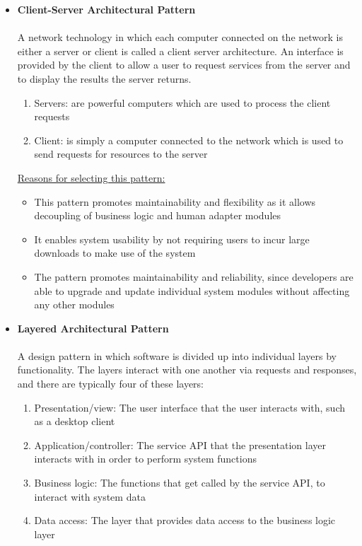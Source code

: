 \documentclass[a4paper,10pt]{article}
\begin{document}
\begin{itemize}
	\item \textbf {Client-Server Architectural Pattern} \\\\
	A network technology in which each computer connected on the network is either a server or client is called a client server architecture. An interface is provided by the client to allow a user to request services from the server and to display the results the server returns. 
	\begin{enumerate}
		\item Servers: are powerful computers which are used to process the client requests
		\item Client: is simply a computer connected to the network which is used to send requests for resources to the server\\
	\end{enumerate}
	\underline{Reasons for selecting this pattern:}
	\begin{itemize}
		\item This pattern promotes maintainability and flexibility  as it allows decoupling of business logic and human adapter modules
		\item It enables system usability by not requiring users to incur large downloads to make use of the system
		\item The pattern promotes maintainability and reliability, since developers are able to upgrade and update individual system modules without affecting any other modules\\
	\end{itemize}
	\item \textbf {Layered Architectural Pattern} \\\\
	A design pattern in which software is divided up into individual layers by functionality. The layers interact with one another via requests and responses, and there are typically four of these layers:
	\begin{enumerate}
		\item Presentation/view: The user interface that the user interacts with, such as a desktop client
		\item Application/controller: The service API that the presentation layer interacts with in order to perform system functions
		\item Business logic: The functions that get called by the service API, to interact with system data
		\item Data access: The layer that provides data access to the business logic layer\\

\end{enumerate}
\end{itemize}
\end{document}
